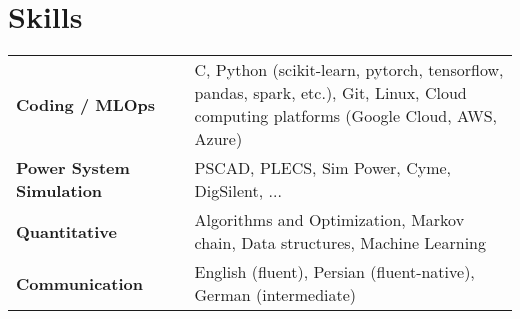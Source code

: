 \documentclass[11pt,a4paper,sans]{moderncv} %
\begin{document}
	\section{Skills}
	\renewcommand{\arraystretch}{1.25}
	\begin{tabular}{p{8em} p{1em} p{35em}}
	\textbf{Coding / MLOps} &  &   C, Python (scikit-learn, pytorch, tensorflow, pandas, spark, etc.), Git, Linux, Cloud computing platforms (Google Cloud, AWS, Azure) \\
	\textbf{Power System Simulation} & & PSCAD, PLECS, Sim Power, Cyme, DigSilent, ...\\
		\textbf{Quantitative} & &  Algorithms and Optimization, Markov chain, Data structures, Machine Learning\\
		\textbf{Communication} & &  English (fluent), Persian (fluent-native), German (intermediate)
	\end{tabular}
	
\end{document}
